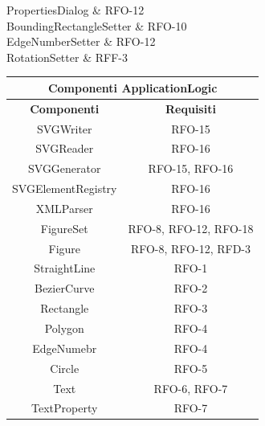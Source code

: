 \begin{table}[h]
\begin{center}
\begin{tabular}
     \hline
     PropertiesDialog & RFO-12 \\ 
     \hline 
     BoundingRectangleSetter & RFO-10 \\
     \hline     	              
	 EdgeNumberSetter & RFO-12\\
	 \hline
	 RotationSetter & RFF-3 \\
    \hline %
    \end{tabular}
  \caption{Componenti GUI - Requisiti} %
  \label{tab:requisitiGUI}
  \end{center}
\end{table}
\newpage

\begin{table}[h]
\begin{center}
     \begin{tabular}
           {@{\extracolsep{\fill}}|c|c|}
      		\hline
           \multicolumn{2}{|c|}{ \textbf{Componenti ApplicationLogic} } \\
     \hline
      \textbf{Componenti} & \textbf{Requisiti} \\
      \hline
     SVGWriter & RFO-15 \\
     \hline
     SVGReader & RFO-16\\
     \hline
     SVGGenerator & RFO-15, RFO-16\\
     \hline
     SVGElementRegistry & RFO-16\\
     \hline
     XMLParser & RFO-16\\
     \hline
     FigureSet & RFO-8, RFO-12, RFO-18 \\
     \hline
     Figure & RFO-8, RFO-12, RFD-3 \\
     \hline
     StraightLine & RFO-1 \\
     \hline
     BezierCurve & RFO-2 \\
     \hline
     Rectangle & RFO-3 \\
     \hline
     Polygon & RFO-4 \\ 
     \hline
     EdgeNumebr & RFO-4 \\
     \hline
     Circle & RFO-5 \\
     \hline
     Text & RFO-6, RFO-7 \\
     \hline
     TextProperty & RFO-7 \\

\end{tabular}
\end{center}
\end{table}

